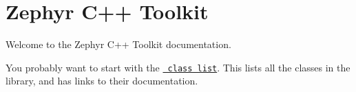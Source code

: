 \chapter{Zephyr C++ Toolkit}
\hypertarget{index}{}\label{index}
\label{index_md_doxygen__mainpage}%
%
 Welcome to the Zephyr C++ Toolkit documentation.

You probably want to start with the \href{/annotated.html}{\texttt{ class list}}. This lists all the classes in the library, and has links to their documentation. 